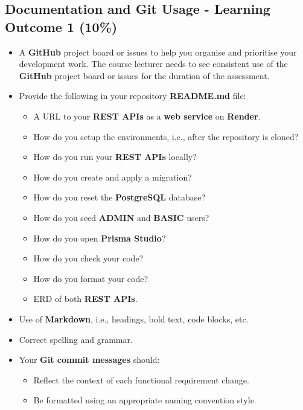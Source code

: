 \documentclass{article}
\begin{document}
\subsection*{Documentation and Git Usage - Learning Outcome 1 (10\%)}
\begin{itemize}
	\item A \textbf{GitHub} project board or issues to help you organise and prioritise your development work. The course lecturer needs to see consistent use of the \textbf{GitHub} project board or issues for the duration of the assessment.
    \item Provide the following in your repository \textbf{README.md} file:
    \begin{itemize} 
	\item A URL to your \textbf{REST APIs} as a \textbf{web service} on \textbf{Render}.
      \item How do you setup the environments, i.e., after the repository is cloned?
	  \item How do you run your \textbf{REST APIs} locally?
	  \item How do you create and apply a migration?  
	  \item How do you reset the \textbf{PostgreSQL} database?
	  \item How do you seed \textbf{ADMIN} and \textbf{BASIC} users?
	  \item How do you open \textbf{Prisma Studio}?
	  \item How do you check your code?
	  \item How do you format your code?
	  \item ERD of both \textbf{REST APIs}.
    \end{itemize}
    \item Use of \textbf{Markdown}, i.e., headings, bold text, code blocks, etc.
    \item Correct spelling and grammar.
    \item Your \textbf{Git commit messages} should:
    \begin{itemize}
      \item Reflect the context of each functional requirement change.
      \item Be formatted using an appropriate naming convention style.
    \end{itemize}	
\end{itemize} 
\end{document}
